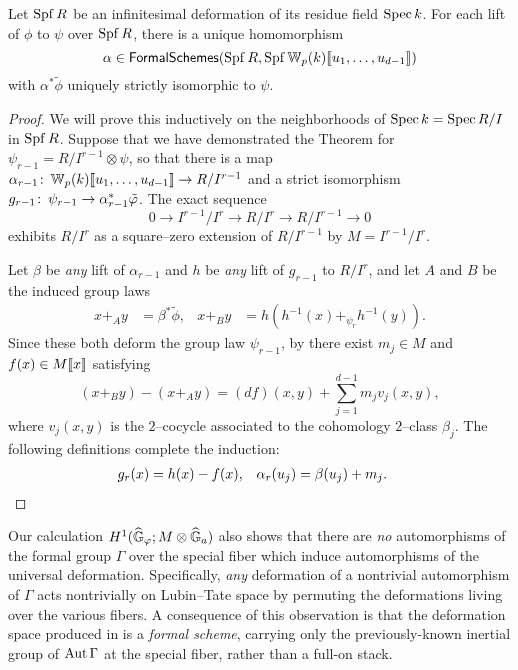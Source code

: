\begin{theorem}\label{LubinTateDeformationSpace}
Let $\operatorname{Spf} R$ be an infinitesimal deformation of its residue field $\operatorname{Spec} k$.  For each lift of $\phi$ to $\psi$ over $\operatorname{Spf} R$, there is a unique homomorphism \[\alpha \in \mathsf{FormalSchemes}(\operatorname{Spf} R, \operatorname{Spf} \mathbb W_p(k)\llbracket{u_1, \ldots, u_{d-1}}\rrbracket)\] with $\alpha^* \tilde \phi$ uniquely strictly isomorphic to $\psi$.
\end{theorem}
\begin{proof}
We will prove this inductively on the neighborhoods of $\operatorname{Spec} k = \operatorname{Spec} R / I$ in $\operatorname{Spf} R$.  Suppose that we have demonstrated the Theorem for $\psi_{r-1} = R / I^{r-1} \otimes \psi$, so that there is a map $\alpha_{r-1}\colon\thinspace \mathbb W_p(k)\llbracket{u_1, \ldots, u_{d-1}}\rrbracket \to R/I^{r-1}$ and a strict isomorphism $g_{r-1}\colon\thinspace \psi_{r-1} \to \alpha_{r-1}^* \tilde {\varphi}$.  The exact sequence \[0 \to I^{r-1} / I^r \to R/I^r \to R/I^{r-1} \to 0\] exhibits $R/I^r$ as a square--zero extension of $R/I^{r-1}$ by $M = I^{r-1} / I^r$.

Let $\beta$ be \emph{any} lift of $\alpha_{r-1}$ and $h$ be \emph{any} lift of $g_{r-1}$ to $R/I^r$, and let $A$ and $B$ be the induced group laws
\begin{align*}
x +_A y & = \beta^* \tilde \phi, &
x +_B y & = h\left( h^{-1}(x) +_{\psi_r} h^{-1}(y) \right).
\end{align*}
Since these both deform the group law $\psi_{r-1}$, by  there exist $m_j \in M$ and $f(x) \in M\llbracket{x}\rrbracket$ satisfying \[(x +_B y) - (x +_A y) = (df)(x, y) + \sum_{j=1}^{d-1} m_j v_j(x, y),\] where $v_j(x, y)$ is the $2$--cocycle associated to the cohomology $2$--class $\beta_j$.  The following definitions complete the induction:
\begin{align*}
g_r(x) & = h(x) - f(x), &
\alpha_r(u_j) & = \beta(u_j) + m_j. \qedhere
\end{align*}
\end{proof}

\begin{remark}\label{ActionBySnLiftsToLTn}
Our calculation $H^1(\widehat{\mathbb G}_\varphi; M \otimes \widehat{\mathbb G}_a)$ also shows that there are \emph{no} automorphisms of the formal group $\Gamma$ over the special fiber which induce automorphisms of the universal deformation.  Specifically, \emph{any} deformation of a nontrivial automorphism of $\Gamma$ acts nontrivially on Lubin--Tate space by permuting the deformations living over the various fibers.  A consequence of this observation is that the deformation space produced in  is a \emph{formal scheme}, carrying only the previously-known inertial group of $\operatorname{Aut} \Gamma$ at the special fiber, rather than a full-on stack.
\end{remark}

